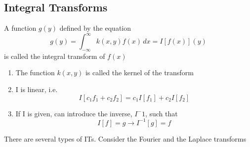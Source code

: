 \documentclass[a4paper, 11pt, normalem]{report}
\newcommand\ifnt{\int_{-\infty}^{\infty}}
\begin{document}
\chapter{}
\section{Integral Transforms}
A function $g(y)$ defined by the equation
\begin{equation*}
    g(y) = \ifnt k(x,y)f(x)\,dx = I[f(x)](y)
\end{equation*}
is called the integral transform of $f(x)$
\begin{enumerate}
    \item The function $k(x,y)$ is called the kernel of the transform
    \item I is linear, i.e.
            \begin{equation*}
                I[c_1 f_1 + c_2 f_2] = c_1 I[f_1] + c_2 I[f_2]
            \end{equation*}
    \item If I is given, can introduce the inverse, $I^-1$, such that
            \begin{equation*}
                I[f] = g \to I^{-1}[g] = f
            \end{equation*}
\end{enumerate}
There are several types of ITs. Consider the Fourier and the Laplace transforms
\end{document}
